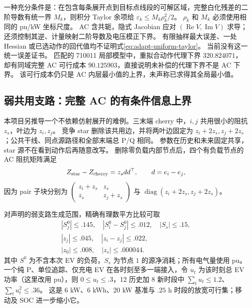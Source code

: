 \documentclass[UTF8,fontset=fandol,11pt,a4paper]{ctexart}
\begin{document}
一种充分条件是：在包含每条展开点到目标点线段的可解区域，完整白化残差的二阶导数有统一界 $M_k$，则积分 Taylor 余项给 $\varepsilon_k\le M_k\rho_k^2/2$。
$\rho_k$ 和 $M_k$ 必须使用相同的 pu/kW 坐标尺度。
AC 含共轭，隐式 Jacobian 应对 $(\operatorname{Re}V,\operatorname{Im}V)$ 求导；还须控制其逆、计量映射二阶导数及电压模正下界。
有限抽样最大误差、一处 Hessian 或已选动作的回代值均不证明式\eqref{eq:adapt-uniform-taylor}。
当前没有这一统一误差证书。
匹配的 710011 局部模型中，重拟合动作代理下界 $320.824071$，却有同域完整 AC 可行成本 $90.125903$，直接说明未补偿的代理下界不是 AC 下界。
该可行成本仍只是 AC 内层最小值的上界，未声称已求得其全局最小值。

\subsection{弱共用支路：完整 AC 的有条件信息上界}
本项目另推导一个不依赖仿射展开的难例。三末端 cherry 中，$i,j$ 共用很小的阻抗 $z_s$，叶边为 $z_i,z_j$。
竞争 star 删除该共用边，并将两叶边固定为 $z_i+2z_s,z_j+2z_s$；公共干线、同点源路径和全部末端总 P/Q 相同。
参数在历史和未来固定共享，star 源不在看到动作后再随意改写。
删除零负载内部节点后，四个有负载节点的 AC 阻抗矩阵满足
\begin{equation}
 Z_{\rm star}-Z_{\rm cherry}=z_sdd^\top,\qquad d=e_i-e_j,
 \label{eq:adapt-weak-matrix}
\end{equation}
因为 pair 子块分别为
$\left(\begin{smallmatrix}z_i+z_s&z_s\\z_s&z_j+z_s\end{smallmatrix}\right)$
与 $\operatorname{diag}(z_i+2z_s,z_j+2z_s)$。

对声明的弱支路生成范围，精确有理数平方比较可取
\[
 \begin{gathered}
 |S_j^0|\le .145,\quad |S_i^0-S_j^0|\le .012,\quad |S_s|\le .15,\\
 |z_j|\le .045,\quad |z_i-z_j|\le .022,\\
 |z_0|\le .008,\quad |z_s|\le .000044.
 \end{gathered}
\]
其中 $S^0$ 为不含本次 EV 的负荷，$S_s$ 为节点 $1$ 的源净消耗；所有电气量使用 pu。
一个纯 P、单位追踪、仅充电 EV 在各时刻至多一端接入，令 $u_t$ 为该时刻总 EV 功率（这里改用 pu），则 $0\le u_t\le .3$，12 历史加 8 新时段中 $\sum_tu_t\le1.2$、$\sum_tu_t^2\le .36$。
这是 6 kW、6 kWh、20 kW 基准与 $.25$ h 时段的放宽可行集；移动及 SOC 进一步缩小它。
\end{document}
